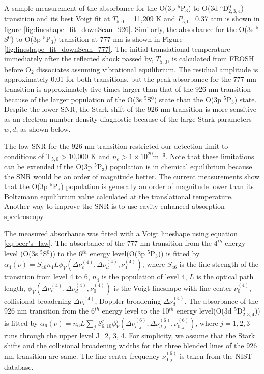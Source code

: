\documentclass[12pt]{iopart}
\begin{document}
A sample measurement of the absorbance for the O(3p $^5$P$_{3}$) to O(3d $^5$D$_{2,3,4}^0$) transition and its best Voigt fit at $T_{5,0}=$11,209 K and $P_{5,0}$=0.37 atm is shown in figure \ref{fig:lineshape_fit_downScan_926}.  Similarly, the absorbance for the O(3s $^5$S$^0$) to O(3p $^5$P$_{3}$) transition at 777 nm  is shown in Figure \ref{fig:lineshape_fit_downScan_777}. The initial translational temperature immediately after the reflected shock passed by, $T_{5,0}$, is calculated from FROSH before O$_2$ dissociates assuming vibrational equilibrium. The residual amplitude is approximately 0.01 for both transitions, but the peak absorbance for the 777 nm transition is approximately five times larger than that of the 926 nm transition because of the larger population of the O(3s $^5$S$^0$) state than the O(3p $^5$P$_{3}$) state. Despite the lower SNR, the Stark shift of the 926 nm transition is more sensitive as an electron number density diagnostic because of the large Stark parameters $w,d$, as shown below. 

The low SNR for the 926 nm transition restricted our detection limit to  conditions of T$_{5,0}>$10,000 K and $n_e>1\times10^{20}$m$^{-3}$. Note that these limitations can be extended if the O(3p $^5$P$_{3}$) population is in chemical equilibrium because the SNR would be an order of magnitude better. The current measurements show that the O(3p $^5$P$_{3}$) population is generally an order of magnitude lower than its Boltzmann equilibrium value calculated at the translational temperature. Another way to improve the SNR is to use cavity-enhanced absorption spectroscopy\cite{nations2015_new,sun_kai_2014,Chao2019}.   

The measured absorbance was fitted with a Voigt lineshape using equation \ref{eq:beer's_law}. The absorbance of the 777 nm transition from the 4$^{th}$ energy level (O(3s $^5$S$^0$)) to the 6$^{th}$ energy level(O(3p $^5$P$_{3}$)) is fitted by $\alpha_{4}(\nu) = S_{46}n_4L\phi_{V}(\Delta \nu^{(4)}_c,\Delta \nu^{(4)}_d, \nu_0^{(4)})$, where $S_{46}$ is the line strength of the transition from level 4 to 6, $n_4$ is the population of level 4, $L$ is the optical path length, $\phi_{V}(\Delta \nu^{(4)}_c,\Delta \nu^{(4)}_d, \nu_0^{(4)})$ is the Voigt lineshape with line-center $\nu_0^{(4)}$, collisional broadening $\Delta \nu_c^{(4)}$, Doppler broadening $\Delta \nu_d^{(4)}$. The absorbance of the 926 nm transition from the 6$^{th}$ energy level to the 10$^{th}$ energy level(O(3d $^5$D$_{2,3,4}^0$)) is fitted by $\alpha_{6}(\nu) = n_6L\sum_j S^j_{6,10}\phi^j_{V}(\Delta \nu^{(6)}_{c,j},\Delta \nu^{(6)}_{d,j}, \nu_{0,j}^{(6)})$, where $j=1, 2, 3$ runs through the upper level J=2, 3, 4. For simplicity, we assume that the Stark shifts and the collisional broadening widths for the three blended lines of the 926 nm transition are same. The line-center frequency $\nu^{(6)}_{0,j}$ is taken from the NIST database.  
\end{document}
